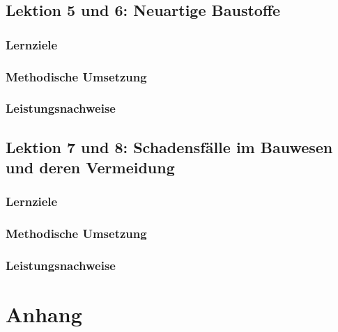 \documentclass[
11pt,
captions=tableheading,
smallheadings,
headsepline,
footsepline, 
captions=tableheading,
parskip=half-,
]{scrartcl}
\begin{document}
\subsection{Lektion 5 und 6: Neuartige Baustoffe}
\subsubsection{Lernziele}
\subsubsection{Methodische Umsetzung}
\subsubsection{Leistungsnachweise}




\subsection{Lektion 7 und 8: Schadensfälle im Bauwesen und deren Vermeidung}
\subsubsection{Lernziele}
\subsubsection{Methodische Umsetzung}
\subsubsection{Leistungsnachweise}





\clearpage
{}

\printbibliography

\clearpage
\appendix

\section{Anhang}
%
\end{document}
